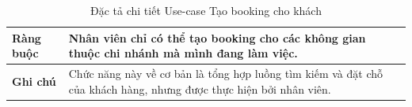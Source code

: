\begin{table}[H]
\begin{tabular}{|p{4cm}|p{10cm}|}
\textbf{Ràng buộc} 
& Nhân viên chỉ có thể tạo booking cho các không gian thuộc chi nhánh mà mình đang làm việc. \\ 
\hline

\textbf{Ghi chú} 
& Chức năng này về cơ bản là tổng hợp luồng tìm kiếm và đặt chỗ của khách hàng, nhưng được thực hiện bởi nhân viên. \\ 
\hline
\end{tabular}
\caption{Đặc tả chi tiết Use-case Tạo booking cho khách}
\label{tab:staff-booking-spec}
\end{table}




